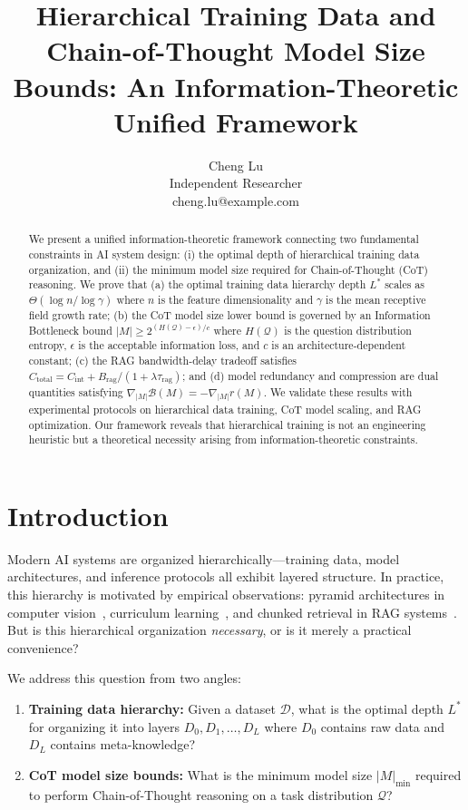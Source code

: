 \documentclass[12pt]{article}
\title{Hierarchical Training Data and Chain-of-Thought Model Size Bounds: An Information-Theoretic Unified Framework}
\author{Cheng Lu\\
Independent Researcher\\
cheng.lu@example.com}
\date{}
\theoremstyle{definition}
\theoremstyle{remark}
\begin{document}
\begin{abstract}
We present a unified information-theoretic framework connecting two fundamental constraints in AI system design: (i) the optimal depth of hierarchical training data organization, and (ii) the minimum model size required for Chain-of-Thought (CoT) reasoning. We prove that (a) the optimal training data hierarchy depth $L^*$ scales as $\Theta(\log n / \log \gamma)$ where $n$ is the feature dimensionality and $\gamma$ is the mean receptive field growth rate; (b) the CoT model size lower bound is governed by an Information Bottleneck bound $|M| \geq 2^{(H(\mathcal{Q}) - \epsilon)/c}$ where $H(\mathcal{Q})$ is the question distribution entropy, $\epsilon$ is the acceptable information loss, and $c$ is an architecture-dependent constant; (c) the RAG bandwidth-delay tradeoff satisfies $C_{\mathrm{total}} = C_{\mathrm{int}} + B_{\mathrm{rag}} / (1 + \lambda \tau_{\mathrm{rag}})$; and (d) model redundancy and compression are dual quantities satisfying $\nabla_{|M|} \mathcal{B}(M) = -\nabla_{|M|} r(M)$. We validate these results with experimental protocols on hierarchical data training, CoT model scaling, and RAG optimization. Our framework reveals that hierarchical training is not an engineering heuristic but a theoretical necessity arising from information-theoretic constraints.
\end{abstract}

\section{Introduction}

Modern AI systems are organized hierarchically---training data, model architectures, and inference protocols all exhibit layered structure. In practice, this hierarchy is motivated by empirical observations: pyramid architectures in computer vision~\cite{lin2016feature}, curriculum learning~\cite{bengio2009curriculum}, and chunked retrieval in RAG systems~\cite{gao2024retrieval}. But is this hierarchical organization \emph{necessary}, or is it merely a practical convenience?

We address this question from two angles:

\begin{enumerate}
  \item \textbf{Training data hierarchy:} Given a dataset $\mathcal{D}$, what is the optimal depth $L^*$ for organizing it into layers $D_0, D_1, \ldots, D_L$ where $D_0$ contains raw data and $D_L$ contains meta-knowledge?
  \item \textbf{CoT model size bounds:} What is the minimum model size $|M|_{\min}$ required to perform Chain-of-Thought reasoning on a task distribution $\mathcal{Q}$?
\end{enumerate}
\end{document}
